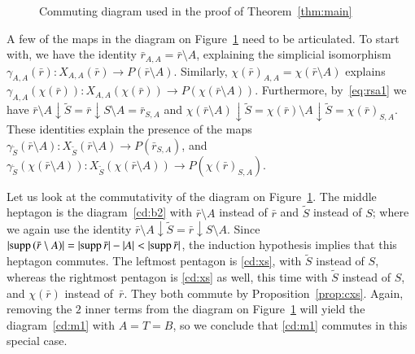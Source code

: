 \documentclass{amsart}[10pt]
\newcommand{\dar}{\downarrow}
\newcommand{\ra}{\rightarrow}
\newcommand{\sm}{\setminus}
\newcommand{\supp}{\text{\rm supp}\,}
\newcommand{\tr}{{\bar r}}
\newcommand{\wti}{\widetilde}
\numberwithin{equation}{section}
\numberwithin{figure}{section}
\numberwithin{table}{section}
\begin{document}
\begin{figure}[hbt]
\caption{Commuting diagram used in the proof of Theorem~\ref{thm:main}}
\label{cdf:mt1}
\end{figure}
 A few of the maps in the diagram on Figure~\ref{cdf:mt1} 
need to be articulated.  To start with, we have the identity $\tr_{A,A}=\tr\sm
A$, explaining the simplicial isomorphism
$\gamma_{A,A}(\tr):X_{A,A}(\tr)\ra P(\tr\sm A)$. Similarly,
$\chi(\tr)_{A,A}=\chi(\tr\sm A)$ explains
$\gamma_{A,A}(\chi(\tr)):X_{A,A}(\chi(\tr))\ra P(\chi(\tr\sm A))$.
Furthermore, by~\eqref{eq:rsa1} we have $\tr\sm A\dar\wti S=\tr\dar
S\sm A=\tr_{S,A}$ and $\chi(\tr\sm A)\dar\wti S=\chi(\tr)\sm A\dar\wti
S=\chi(\tr)_{S,A}$. These identities explain the presence of the maps
$\gamma_{\wti S}(\tr\sm A):X_{\wti S}(\tr\sm A)\ra P(\tr_{S,A})$, and
$\gamma_{\wti S}(\chi(\tr\sm A)):X_{\wti S}(\chi(\tr\sm A))\ra
P(\chi(\tr)_{S,A})$.

Let us look at the commutativity of the diagram on Figure~\ref{cdf:mt1}. The middle
heptagon is the diagram~\eqref{cd:b2} with $\tr\sm A$ instead of $\tr$
and $\wti S$ instead of $S$; where we again use the identity $\tr\sm
A\dar\wti S=\tr\dar S\sm A$. Since $|\supp(\tr\sm
A)|=|\supp\tr|-|A|<|\supp\tr|$, the induction hypothesis implies that
this heptagon commutes. The leftmost pentagon is \eqref{cd:xs}, with
$\wti S$ instead of $S$, whereas the rightmost pentagon is
\eqref{cd:xs} as well, this time with $\wti S$ instead of $S$, and
$\chi(\tr)$ instead of~$\tr$. They both commute by
Proposition~\ref{prop:cxs}. Again, removing the $2$ inner terms from
the diagram on Figure~\ref{cdf:mt1} will yield the diagram~\eqref{cd:m1} with
$A=T=B$, so we conclude that \eqref{cd:m1} commutes in this special
case.
\end{document}
